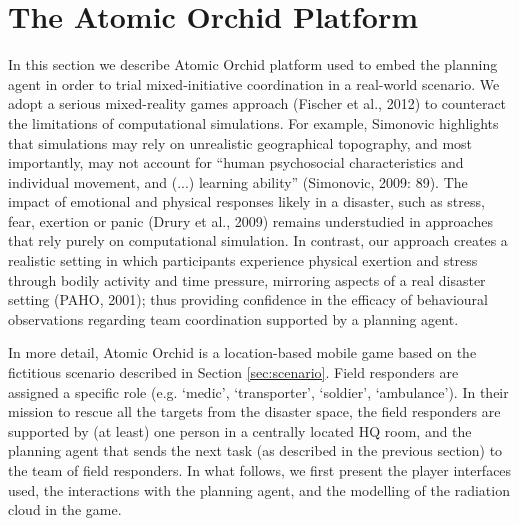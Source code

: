 \section{The Atomic Orchid Platform}
In this section we describe Atomic Orchid platform used to embed the planning agent in order to trial mixed-initiative coordination in a real-world scenario.
We adopt a serious mixed-reality games approach (Fischer et al., 2012) to counteract the limitations of computational simulations. For example, Simonovic highlights that simulations may rely on unrealistic geographical topography, and most importantly, may not account for ``human psychosocial characteristics and individual movement, and (...) learning ability'' (Simonovic, 2009: 89). The impact of emotional and physical responses likely in a disaster, such as stress, fear, exertion or panic (Drury et al., 2009) remains understudied in approaches that rely purely on computational simulation. In contrast, our approach creates a realistic setting in which participants experience physical exertion and stress through bodily activity and time pressure, mirroring aspects of a real disaster setting (PAHO, 2001); thus providing confidence in the efficacy of behavioural observations regarding team coordination supported by a planning agent.

In more detail, Atomic Orchid is a location-based mobile game based on the fictitious scenario described in Section \ref{sec:scenario}. Field responders are assigned a specific role (e.g. `medic', `transporter', `soldier', `ambulance'). In their mission to rescue all the targets from the disaster space, the field responders are supported by (at least) one person in a centrally located HQ room, and the planning agent that sends the next task (as described in the previous section) to the team of field responders. In what follows, we first present the player interfaces used, the interactions with the planning agent, and the modelling of the radiation cloud in the game.





 